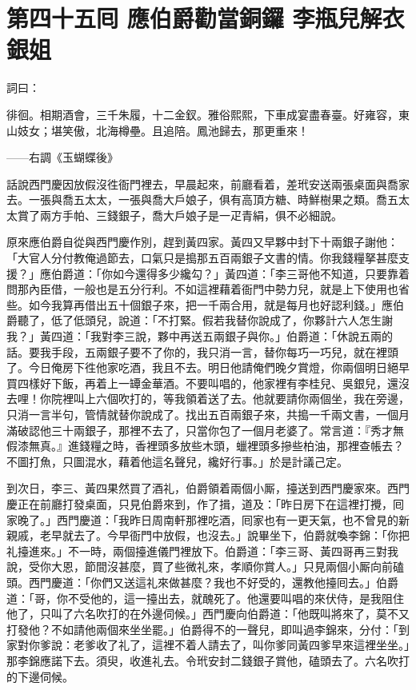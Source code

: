 
\chapter*{第四十五囘 應伯爵勸當銅鑼 李瓶兒解衣銀姐}


詞曰：

徘徊。相期酒會，三千朱履，十二金釵。雅俗熙熙，下車成宴盡春臺。好雍容，東山妓女；堪笑傲，北海樽壘。且追陪。鳳池歸去，那更重來！

——右調《玉蝴蝶後》

話說西門慶因放假沒徃衙門裡去，早晨起來，前廳看着，差玳安送兩張桌面與喬家去。一張與喬五太太，一張與喬大戶娘子，俱有高頂方糖、時鮮樹果之類。喬五太太賞了兩方手帕、三錢銀子，喬大戶娘子是一疋青絹，俱不必細說。

原來應伯爵自從與西門慶作別，趕到黃四家。黃四又早夥中封下十兩銀子謝他：「大官人分付教俺過節去，口氣只是搗那五百兩銀子文書的情。你我錢糧拏甚麼支援？」應伯爵道：「你如今還得多少纔勾？」黃四道：「李三哥他不知道，只要靠着問那內臣借，一般也是五分行利。不如這裡藉着衙門中勢力兒，就是上下使用也省些。如今我算再借出五十個銀子來，把一千兩合用，就是每月也好認利錢。」應伯爵聽了，低了低頭兒，說道：「不打緊。假若我替你說成了，你夥計六人怎生謝我？」黃四道：「我對李三說，夥中再送五兩銀子與你。」伯爵道：「休說五兩的話。要我手段，五兩銀子要不了你的，我只消一言，替你每巧一巧兒，就在裡頭了。今日俺房下徃他家吃酒，我且不去。明日他請俺們晚夕賞燈，你兩個明日絕早買四樣好下飯，再着上一罈金華酒。不要叫唱的，他家裡有李桂兒、吳銀兒，還沒去哩！你院裡叫上六個吹打的，等我領着送了去。他就要請你兩個坐，我在旁邊，只消一言半句，管情就替你說成了。找出五百兩銀子來，共搗一千兩文書，一個月滿破認他三十兩銀子，那裡不去了，只當你包了一個月老婆了。常言道：『秀才無假漆無真。』{}進錢糧之時，香裡頭多放些木頭，蠟裡頭多摻些柏油，那裡查帳去？不圖打魚，只圖混水，藉着他這名聲兒，纔好行事。」於是計議己定。

到次日，李三、黃四果然買了酒礼，伯爵領着兩個小厮，擡送到西門慶家來。西門慶正在前廳打發桌面，只見伯爵來到，作了揖，道及：「昨日房下在這裡打攪，囘家晚了。」西門慶道：「我昨日周南軒那裡吃酒，囘家也有一更天氣，也不曾見的新親戚，老早就去了。今早衙門中放假，也沒去。」說畢坐下，伯爵就喚李錦：「你把礼擡進來。」不一時，兩個擡進儀門裡放下。伯爵道：「李三哥、黃四哥再三對我說，受你大恩，節間沒甚麼，買了些微礼來，孝順你賞人。」只見兩個小厮向前磕頭。西門慶道：「你們又送這礼來做甚麼？我也不好受的，還教他擡囘去。」伯爵道：「哥，你不受他的，這一擡出去，就醜死了。他還要叫唱的來伏侍，是我阻住他了，只叫了六名吹打的在外邊伺候。」西門慶向伯爵道：「他既叫將來了，莫不又打發他？不如請他兩個來坐坐罷。」伯爵得不的一聲兒，即叫過李錦來，分付：「到家對你爹說：老爹收了礼了，這裡不着人請去了，叫你爹同黃四爹早來這裡坐坐。」那李錦應諾下去。須臾，收進礼去。令玳安封二錢銀子賞他，磕頭去了。六名吹打的下邊伺候。

